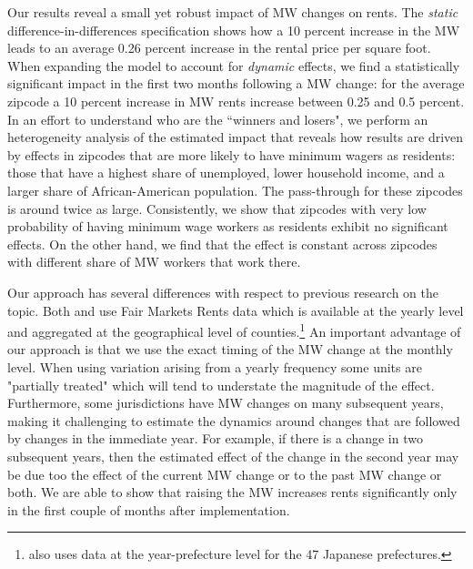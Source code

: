 Our results reveal a small yet robust impact of MW changes on rents. The \textit{static} 
difference-in-differences specification shows how a 10 percent increase in the MW leads to an average 
0.26 percent increase in the rental price per square foot. When expanding the model to account for 
\textit{dynamic} effects, we find a statistically significant impact in the first two months following 
a MW change: for the average zipcode a 10 percent increase in MW rents increase between 0.25 and 
0.5 percent. In an effort to understand who are the ``winners and losers", we perform an heterogeneity 
analysis of the estimated impact that reveals how results are driven by effects in zipcodes that are 
more likely to have minimum wagers as residents: those that have a highest share of unemployed, lower 
household income, and a larger share of African-American population. The pass-through for these 
zipcodes is around twice as large. Consistently, we show that zipcodes with very low probability of 
having minimum wage workers as residents exhibit no significant effects. On the other hand, we find 
that the effect is constant across zipcodes with different share of MW workers that work there.

Our approach has several differences with respect to previous research on the topic. Both 
\textcite{tidemann2018mw} and \textcite{yamagishi2019minimum} use Fair Markets Rents data which is 
available at the yearly level and aggregated at the geographical level of counties.\footnote{
	\textcite{yamagishi2019minimum} also uses data at the year-prefecture level for the 47 Japanese 
	prefectures.} 
An important advantage of our approach is that we use the exact timing of the MW change at the monthly 
level. When using variation arising from a yearly frequency some units are "partially treated" which 
will tend to understate the magnitude of the effect. Furthermore, some jurisdictions have MW changes 
on many subsequent years, making it challenging to estimate the dynamics around changes that are 
followed by changes in the immediate year. For example, if there is a change in two subsequent years, 
then the estimated effect of the change in the second year may be due too the effect of the current MW 
change or to the past MW change or both. We are able to show that raising the MW increases rents 
significantly only in the first couple of months after implementation.

